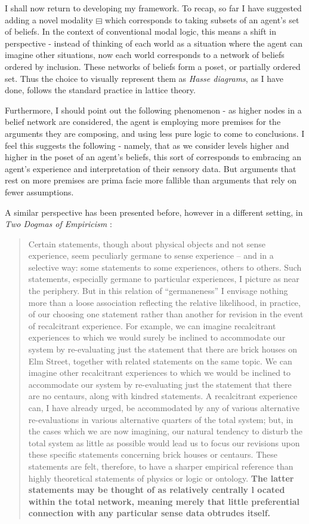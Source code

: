 \documentclass[11pt]{article}
\numberwithin{equation}{subsection}
\newcommand{\BM}{\boxminus}
\begin{document}
I shall now return to developing my framework.  To recap, so far I have suggested adding a novel modality $\BM$ which corresponds to taking subsets of an agent's set of beliefs.  In the context of conventional modal logic, this means a shift in perspective - instead of thinking of each world as a situation where the agent can imagine other situations, now each world corresponds to a network of beliefs ordered by inclusion. These networks of beliefs form a poset, or partially ordered set.  Thus the choice to visually represent them as \emph{Hasse diagrams}, as I have done, follows the standard practice in lattice theory. %

Furthermore, I should point out the following phenomenon - as higher nodes in a belief network are considered, the agent is employing more premises for the arguments they are composing, and using less pure logic to come to conclusions.  I feel this suggests the following - namely, that as we consider levels higher and higher in the poset of an agent's beliefs, this sort of corresponds to embracing an agent's experience and interpretation of their sensory data.  But arguments that rest on more premises are prima facie more fallible than arguments that rely on fewer assumptions.

A similar perspective has been presented before, however in a different setting, in \emph{Two Dogmas of Empiricism} \citep{quine_two_1951}:
\begin{quote}
{Certain statements, though about physical objects and not sense experience, seem peculiarly germane to sense experience -- and in a selective way: some statements to some experiences, others to others. Such statements, especially germane to particular experiences, I picture as near the periphery. But in this relation of ``germaneness'' I envisage nothing more than a loose association reflecting the relative likelihood, in practice, of our choosing one statement rather than another for revision in the event of recalcitrant experience. For example, we can imagine recalcitrant experiences to which we would surely be inclined to accommodate our system by re-evaluating just the statement that there are brick houses on Elm Street, together with related statements on the same topic. We can imagine other recalcitrant experiences to which we would be inclined to accommodate our system by re-evaluating just the statement that there are no centaurs, along with kindred statements. A recalcitrant experience can, I have already urged, be accommodated by any of various alternative re-evaluations in various alternative quarters of the total system; but, in the cases which we are now imagining, our natural tendency to disturb the total system as little as possible would lead us to focus our revisions upon these specific statements concerning brick houses or centaurs. These statements are felt, therefore, to have a sharper empirical reference than highly theoretical statements of physics or logic or ontology. \textbf{The latter statements may be thought of as relatively centrally l	ocated within the total network, meaning merely that little preferential connection with any particular sense data obtrudes itself.} }
\end{quote}
\end{document}
